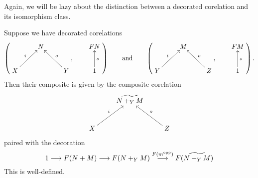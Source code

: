 Again, we will be lazy about the distinction between a decorated corelation and
its isomorphism class.

Suppose we have decorated corelations
  \[
    \left(
    \begin{aligned}
      \xymatrix{
	& N \\  
	X \ar[ur]^{i} && Y \ar[ul]_{o}
      }
    \end{aligned}
    ,
    \qquad
    \begin{aligned}
      \xymatrix{
	FN \\
	1 \ar[u]_{s}
      }
    \end{aligned}
    \right)
    \qquad
    \mbox{and}
    \qquad
    \left(
    \begin{aligned}
      \xymatrix{
	& M \\  
	Y \ar[ur]^{i} && Z \ar[ul]_{o}
      }
    \end{aligned}
    ,
    \qquad
    \begin{aligned}
      \xymatrix{
	FM \\
	1 \ar[u]_{s}
      }
    \end{aligned}
    \right).
  \]
  Then their composite is given by the composite corelation
  \[
    \xymatrix{
      & \widetilde{N+_YM} \\  
      X \ar[ur]^{i} && Z \ar[ul]_{o}
    }
  \]
  paired with the decoration
  \[
    1 \longrightarrow F(N+M) \longrightarrow F(N+_YM) \stackrel{F(m^{\mathrm{opp}})}\longrightarrow F(\widetilde{N+_YM})
  \]
  This is well-defined.

